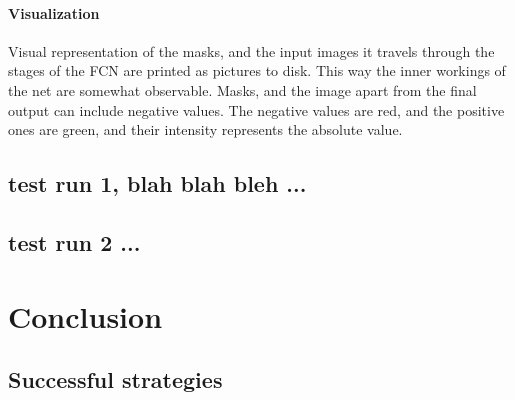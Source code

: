 \documentclass[a4paper,12pt]{article}
\begin{document}
\paragraph{Visualization}Visual representation of the masks, and the input images it travels through the stages of the FCN are printed as pictures to disk. This way the inner workings of the net are somewhat observable. Masks, and the image apart from the final output can include negative values. The negative values are red, and the positive ones are green, and their intensity represents the absolute value.
\subsection{test run 1, blah blah bleh ...}
\subsection{test run 2 ...}
\newpage
\section{Conclusion}
\subsection{Successful strategies}
\begin{appendix}
\listoffigures
\listoftables
\end{appendix}
\end{document}
